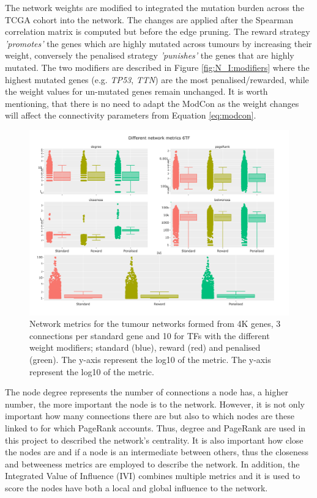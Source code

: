 The network weights are modified to integrated the mutation burden across the TCGA cohort into the network. The changes are applied after the Spearman correlation matrix is computed but before the edge pruning. The reward strategy \textit{'promotes'} the genes which are highly mutated across tumours by increasing their weight, conversely the penalised strategy \textit{'punishes'} the genes that are highly mutated. The two modifiers are described in Figure \ref{fig:N_I:modifiers} where the highest mutated genes (e.g. \textit{TP53}, \textit{TTN}) are the most penalised/rewarded, while the weight values for un-mutated genes remain unchanged. It is worth mentioning, that there is no need to adapt the ModCon as the weight changes will affect the connectivity parameters from Equation \ref{eq:modcon}.


\begin{figure}[!htb]    \centering\includegraphics[width=1.0\textwidth,height=0.7\textheight,keepaspectratio]{Sections/Network_I/Resources/Tum_network/NetworkMetricsComp_6TF.png}
    \caption{Network metrics for the tumour networks formed from 4K genes, 3 connections per standard gene and 10 for TFs with the different weight modifiers; standard (blue), reward (red) and penalised (green). The y-axis represent the log10 of the metric.  The y-axis represent the log10 of the metric.}
    \label{fig:N_I:net_metrics_tum}
\end{figure}

The node degree represents the number of connections a node has, a higher number, the more important the node is to the network. However, it is not only important how many connections there are but also to which nodes are these linked to for which PageRank\cite{Brin1998-mc} accounts. Thus, degree and PageRank are used in this project to described the network's centrality. It is also important how close the nodes are and if a node is an intermediate between others, thus the closeness and betweeness metrics are employed to describe the network. In addition, the Integrated Value of Influence (IVI) \cite{Salavaty2020-wo} combines multiple metrics and it is used to score the nodes have both a local and global influence to the network.




